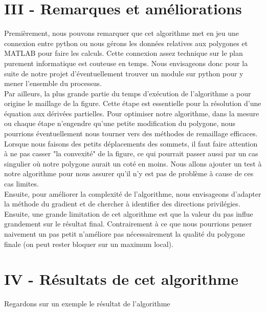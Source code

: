 \documentclass[a4paper,reqno]{article}
\begin{document}
\section*{III - Remarques et améliorations}
Premièrement, nous pouvons remarquer que cet algorithme met en jeu une connexion entre python ou nous gérons les données relatives aux polygones et MATLAB pour faire les calculs. Cette connexion assez technique sur le plan purement informatique est couteuse en temps. Nous envisageons donc pour la suite de notre projet d'éventuellement trouver un module sur python pour y mener l'ensemble du processus. \\
Par ailleurs, la plus grande partie du temps d'exécution de l'algorithme a pour origine le maillage de la figure. Cette étape est essentielle pour la résolution d'une équation aux dérivées partielles. Pour optimiser notre algorithme, dans la mesure ou chaque étape n'engendre qu'une petite modification du polygone, nous pourrions éventuellement nous tourner vers des méthodes de remaillage efficaces. \\
Lorsque nous faisons des petits déplacements des sommets, il faut faire attention à ne pas casser "la convexité" de la figure, ce qui pourrait passer aussi par un cas singulier où notre polygone aurait un coté en moins. Nous allons ajouter un test à notre algorithme pour nous assurer qu'il n'y est pas de problème à cause de ces cas limites. \\
Ensuite, pour améliorer la complexité de l'algorithme, nous envisageons d'adapter la méthode du gradient et de chercher à identifier des directions privilégies.\\
Ensuite, une grande limitation de cet algorithme est que la valeur du pas influe grandement sur le résultat final. Contrairement à ce que nous pourrions penser naivement un pas petit n'améliore pas nécessairement la qualité du polygone finale (on peut rester bloquer sur un maximum local).

\newpage
\section*{IV - Résultats de cet algorithme }

Regardons sur un exemple le résultat de l'algorithme
\end{document}
